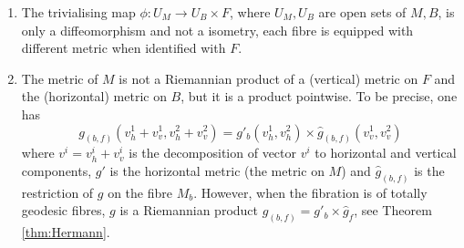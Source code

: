 \begin{remark}
\begin{enumerate}
\item The trivialising map \(\phi: U_M \longrightarrow U_B\times F\), where \(U_M, U_B\) are
open sets of \(M,B\), is only a diffeomorphism and not a isometry, each fibre is equipped
with different metric when identified with \(F\).
\item The metric of \(M\) is not a Riemannian product of a (vertical) metric on \(F\)
and the (horizontal) metric on \(B\), but it is a product pointwise. To be precise,
one has
\begin{equation}
\label{eq:g-product}
 g_{(b,f)}(v_h^1 + v_v^1, v_h^2 + v_v^2) = g'_b(v^1_h, v^2_h)\times \hat{g}_{(b,f)}(v_v^1, v_v^2)   
\end{equation}
where \(v^i = v_h^i + v_v^i\) is the decomposition of vector \(v^i\) to horizontal and vertical components,
\(g'\) is the horizontal metric (the metric on \(M\)) and \(\hat g_{(b,f)}\) is
the restriction of \(g\) on the fibre \(M_b\). However, when the fibration is of
totally geodesic fibres, \(g\) is a Riemannian product \(g_{(b,f)} = g'_b\times \hat
   g_f\), see Theorem \ref{thm:Hermann}.
\end{enumerate}
\end{remark}


